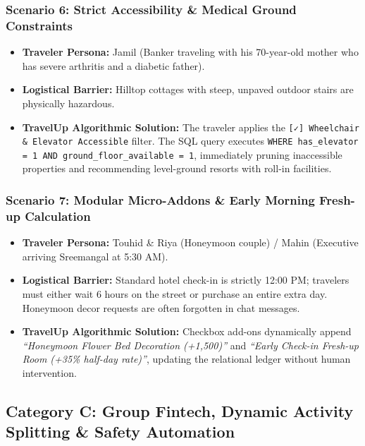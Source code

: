 \documentclass[11pt,a4paper]{article}
\begin{document}
\subsubsection{Scenario 6: Strict Accessibility \& Medical Ground Constraints}
\begin{itemize}[leftmargin=*]
    \item \textbf{Traveler Persona:} Jamil (Banker traveling with his 70-year-old mother who has severe arthritis and a diabetic father).
    \item \textbf{Logistical Barrier:} Hilltop cottages with steep, unpaved outdoor stairs are physically hazardous.
    \item \textbf{TravelUp Algorithmic Solution:} The traveler applies the \texttt{[✓] Wheelchair \& Elevator Accessible} filter. The SQL query executes \texttt{WHERE has\_elevator = 1 AND ground\_floor\_available = 1}, immediately pruning inaccessible properties and recommending level-ground resorts with roll-in facilities.
\end{itemize}

\subsubsection{Scenario 7: Modular Micro-Addons \& Early Morning Fresh-up Calculation}
\begin{itemize}[leftmargin=*]
    \item \textbf{Traveler Persona:} Touhid \& Riya (Honeymoon couple) / Mahin (Executive arriving Sreemangal at 5:30 AM).
    \item \textbf{Logistical Barrier:} Standard hotel check-in is strictly 12:00 PM; travelers must either wait 6 hours on the street or purchase an entire extra day. Honeymoon decor requests are often forgotten in chat messages.
    \item \textbf{TravelUp Algorithmic Solution:} Checkbox add-ons dynamically append \textit{``Honeymoon Flower Bed Decoration (+1,500)''} and \textit{``Early Check-in Fresh-up Room (+35\% half-day rate)''}, updating the relational ledger without human intervention.
\end{itemize}

\subsection{Category C: Group Fintech, Dynamic Activity Splitting \& Safety Automation}
\end{document}
